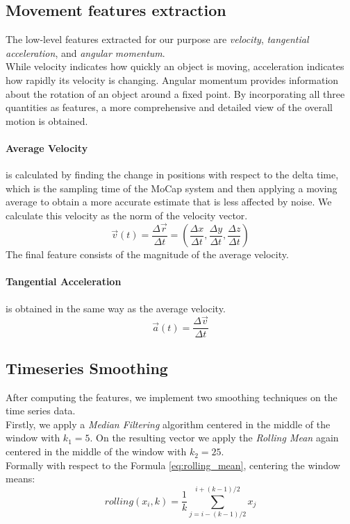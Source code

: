 \subsection{Movement features extraction}
\label{subsec:alg_features}
The low-level features extracted for our purpose are \textit{velocity}, \textit{tangential acceleration}, and \textit{angular momentum}. \\
While velocity indicates how quickly an object is moving, acceleration indicates how rapidly its velocity is changing.
Angular momentum provides information about the rotation of an object around a fixed point.
By incorporating all three quantities as features, a more comprehensive and detailed view of the overall motion is obtained.

\paragraph{Average Velocity} is calculated by finding the change in positions with respect to the delta time, which is the sampling time of the MoCap system and then applying a moving average to obtain a more accurate estimate that is less affected by noise.
We calculate this velocity as the norm of the velocity vector.
\begin{equation}
  \vec{v}(t) = \frac{\Delta\vec{r}}{\Delta  t} = \left(\frac{\Delta x}{\Delta t}, \frac{\Delta  y}{\Delta t}, \frac{\Delta z}{\Delta t}\right)
\end{equation}
The final feature consists of the magnitude of the average velocity.

\paragraph{Tangential Acceleration} is obtained in the same way as the average velocity.
\begin{equation}
  \vec{a}(t) = \frac{\Delta\vec{v}}{\Delta t}
\end{equation}

\subsection{Timeseries Smoothing}
After computing the features, we implement two smoothing techniques on the time series data. \\
Firstly, we apply a \textit{Median Filtering} algorithm centered in the middle of the window with $k_1 = 5$. 
On the resulting vector we apply the \textit{Rolling Mean} again centered in the middle of the window with $k_2 = 25 $. \\
Formally with respect to the Formula \ref{eq:rolling_mean}, centering the window means:
\begin{equation}
  rolling(x_i,k) = \frac{1}{k} \sum_{j=i-(k-1)/2}^{i+(k-1)/2} x_j
\end{equation}

